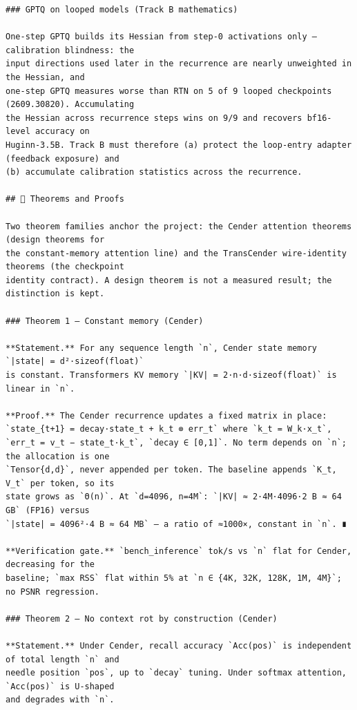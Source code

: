 \begin{Verbatim}[breaklines,breakanywhere,fontsize=\footnotesize]
### GPTQ on looped models (Track B mathematics)

One-step GPTQ builds its Hessian from step-0 activations only — calibration blindness: the
input directions used later in the recurrence are nearly unweighted in the Hessian, and
one-step GPTQ measures worse than RTN on 5 of 9 looped checkpoints (2609.30820). Accumulating
the Hessian across recurrence steps wins on 9/9 and recovers bf16-level accuracy on
Huginn-3.5B. Track B must therefore (a) protect the loop-entry adapter (feedback exposure) and
(b) accumulate calibration statistics across the recurrence.

## 🧪 Theorems and Proofs

Two theorem families anchor the project: the Cender attention theorems (design theorems for
the constant-memory attention line) and the TransCender wire-identity theorems (the checkpoint
identity contract). A design theorem is not a measured result; the distinction is kept.

### Theorem 1 — Constant memory (Cender)

**Statement.** For any sequence length `n`, Cender state memory `|state| = d²·sizeof(float)`
is constant. Transformers KV memory `|KV| = 2·n·d·sizeof(float)` is linear in `n`.

**Proof.** The Cender recurrence updates a fixed matrix in place:
`state_{t+1} = decay·state_t + k_t ⊗ err_t` where `k_t = W_k·x_t`,
`err_t = v_t − state_t·k_t`, `decay ∈ [0,1]`. No term depends on `n`; the allocation is one
`Tensor{d,d}`, never appended per token. The baseline appends `K_t, V_t` per token, so its
state grows as `Θ(n)`. At `d=4096, n=4M`: `|KV| ≈ 2·4M·4096·2 B ≈ 64 GB` (FP16) versus
`|state| = 4096²·4 B ≈ 64 MB` — a ratio of ≈1000×, constant in `n`. ∎

**Verification gate.** `bench_inference` tok/s vs `n` flat for Cender, decreasing for the
baseline; `max RSS` flat within 5% at `n ∈ {4K, 32K, 128K, 1M, 4M}`; no PSNR regression.

### Theorem 2 — No context rot by construction (Cender)

**Statement.** Under Cender, recall accuracy `Acc(pos)` is independent of total length `n` and
needle position `pos`, up to `decay` tuning. Under softmax attention, `Acc(pos)` is U-shaped
and degrades with `n`.


\end{Verbatim}

